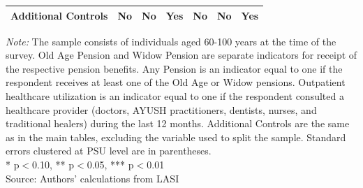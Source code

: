 \documentclass[
  11pt,
]{article}
\begin{document}
\begin{table}[H]
{\begin{tabular}{lcccccc}
\textbf{Additional Controls} & No & No & Yes & No & No & Yes \\
\bottomrule
\end{tabular}
}
\vspace{2mm}
\begin{minipage}{0.95\textwidth}
\footnotesize \textit{Note:} The sample consists of individuals aged 60-100 years at the time of the survey. Old Age Pension and Widow Pension are separate indicators for receipt of the respective pension benefits. Any Pension is an indicator equal to one if the respondent receives at least one of the Old Age or Widow pensions. Outpatient healthcare utilization is an indicator equal to one if the respondent consulted a healthcare provider (doctors, AYUSH practitioners, dentists, nurses, and traditional healers) during the last 12 months. Additional Controls are the same as in the main tables, excluding the variable used to split the sample. Standard errors clustered at PSU level are in parentheses. \\ * p$<$0.10, ** p$<$0.05, *** p$<$0.01\\
Source: Authors' calculations from LASI
\end{minipage}
\end{table}
\end{document}
